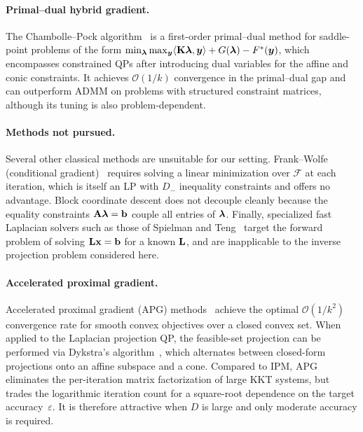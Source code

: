 \paragraph{Primal--dual hybrid gradient.} The Chambolle--Pock algorithm~\cite{chambolle2011first} is a first-order primal--dual method for saddle-point problems of the form $\min_{\boldsymbol{\lambda}}\max_{\boldsymbol{y}}\langle\mathbf{K}\boldsymbol{\lambda},\boldsymbol{y}\rangle + G(\boldsymbol{\lambda}) - F^\ast(\boldsymbol{y})$, which encompasses constrained QPs after introducing dual variables for the affine and conic constraints. It achieves $\mathcal{O}(1/k)$ convergence in the primal--dual gap and can outperform ADMM on problems with structured constraint matrices, although its tuning is also problem-dependent.

\paragraph{Methods not pursued.} Several other classical methods are unsuitable for our setting. Frank--Wolfe (conditional gradient)~\cite{frank1956algorithm} requires solving a linear minimization over $\mathcal{F}$ at each iteration, which is itself an LP with $D_-$ inequality constraints and offers no advantage. Block coordinate descent does not decouple cleanly because the equality constraints $\mathbf{A}\boldsymbol{\lambda}=\mathbf{b}$ couple all entries of $\boldsymbol{\lambda}$. Finally, specialized fast Laplacian solvers such as those of Spielman and Teng~\cite{spielman2014nearly} target the forward problem of solving $\mathbf{L}\mathbf{x}=\mathbf{b}$ for a known $\mathbf{L}$, and are inapplicable to the inverse projection problem considered here.

\paragraph{Accelerated proximal gradient.} Accelerated proximal gradient (APG) methods~\cite{fista,nesterov2013gradient} achieve the optimal $\mathcal{O}(1/k^2)$ convergence rate for smooth convex objectives over a closed convex set. When applied to the Laplacian projection QP, the feasible-set projection can be performed via Dykstra's algorithm~\cite{dykstra1983algorithm}, which alternates between closed-form projections onto an affine subspace and a cone. Compared to IPM, APG eliminates the per-iteration matrix factorization of large KKT systems, but trades the logarithmic iteration count for a square-root dependence on the target accuracy~$\varepsilon$. It is therefore attractive when $D$ is large and only moderate accuracy is required.

